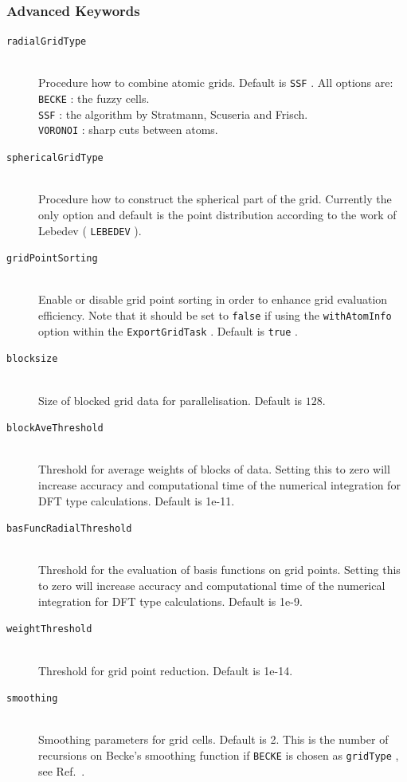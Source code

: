 \documentclass[bibliography=totocnumbered,a4paper,10pt,oneside]{scrbook}
\newcommand{\ttt}[1]{%
  \begingroup\setlength{\fboxsep}{1pt}%
  \colorbox{serenity-green!30}{\texttt{\hspace*{2pt}\vphantom{(g}#1\hspace*{2pt}}}%
  \endgroup
}
\begin{document}
\subsubsection{Advanced Keywords}
\begin{description}
    \item [\texttt{radialGridType}]\hfill \\
    Procedure how to combine atomic grids. Default is \ttt{SSF}.
    All options are:\\
    \ttt{BECKE}: the fuzzy cells\cite{beck1988}.\\ 
    \ttt{SSF}: the algorithm by Stratmann, Scuseria and Frisch\cite{stra1996}.\\ 
    \ttt{VORONOI}: sharp cuts between atoms.
    \item [\texttt{sphericalGridType}]\hfill \\
    Procedure how to construct the spherical part of the grid. Currently the only option and default is 
    the point distribution according to the work of Lebedev (\ttt{LEBEDEV}).
    \item [\texttt{gridPointSorting}]\hfill \\
    Enable or disable grid point sorting in order to enhance grid evaluation efficiency. Note that it should be
    set to \ttt{false} if using the \ttt{withAtomInfo} option within the \ttt{ExportGridTask}. Default is \ttt{true}.
    \item [\texttt{blocksize}]\hfill \\
    Size of blocked grid data  for parallelisation. Default is $128$.
    \item [\texttt{blockAveThreshold}]\hfill \\
    Threshold for average weights of blocks of data. Setting this to zero will increase accuracy and computational time of the numerical 
    integration for DFT type calculations. Default is 1e-11.
    \item [\texttt{basFuncRadialThreshold}]\hfill \\
    Threshold for the evaluation of basis functions on grid points. Setting this to zero will increase accuracy and computational time of the numerical 
    integration for DFT type calculations. Default is 1e-9.
    \item [\texttt{weightThreshold}]\hfill \\
    Threshold for grid point reduction. Default is 1e-14.
    \item [\texttt{smoothing}]\hfill \\
    Smoothing parameters for grid cells. Default is 2. This is the number of recursions on Becke's smoothing 
    function if \ttt{BECKE} is chosen as \ttt{gridType}, see Ref.~\cite{beck1988}.
 \end{description}
\end{document}
